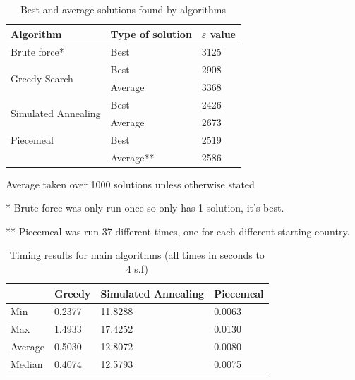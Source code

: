 \documentclass[12pt]{report}
\begin{document}
\begin{table}[H]
\centering
\caption{Best and average solutions found by algorithms}
\label{solutionsFound}
\begin{tabular}{|l|l|l|}
\hline
Algorithm                            & Type of solution & $\varepsilon$ value \\ \hline
Brute force*                          & Best             & 3125                \\ \hline
\multirow{2}{*}{Greedy Search}        & Best             & 2908                \\ \cline{2-3} 
                                     & Average          & 3368                \\ \hline
\multirow{2}{*}{Simulated Annealing} & Best             & 2426                \\ \cline{2-3}
                                     & Average          & 2673                \\ \hline
Piecemeal                            & Best             & 2519                \\ \cline{2-3}
                                     & Average**          & 2586                \\ \hline
\end{tabular}
\end{table}
Average taken over 1000 solutions unless otherwise stated

* Brute force was only run once so only has 1 solution, it's best.

** Piecemeal was run 37 different times, one for each different starting country.

\begin{table}[H]
\centering
\caption{Timing results for main algorithms (all times in seconds to 4 s.f)}
\label{timing}
\begin{tabular}{|l|l|l|l|}
\hline
        & Greedy & Simulated Annealing & Piecemeal \\ \hline
Min     & 0.2377 & 11.8288             & 0.0063    \\ \hline
Max     & 1.4933 & 17.4252             & 0.0130    \\ \hline
Average & 0.5030 & 12.8072             & 0.0080    \\ \hline
Median  & 0.4074 & 12.5793             & 0.0075    \\ \hline
\end{tabular}
\end{table}
\end{document}
